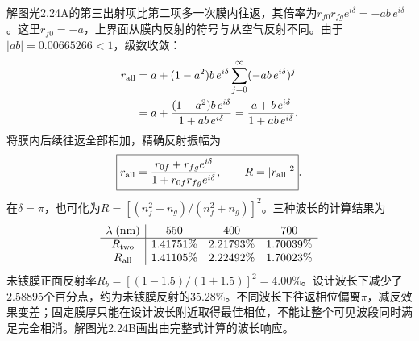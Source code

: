 \documentclass[UTF8,fontset=fandol,a4paper,11pt]{ctexart}
\begin{document}
解图光2.24A的第三出射项比第二项多一次膜内往返，其倍率为$r_{f0}r_{fg}e^{i\delta}=-ab\,e^{i\delta}$。这里$r_{f0}=-a$，上界面从膜内反射的符号与从空气反射不同。由于$|ab|=0.00665266<1$，级数收敛：
\[
\begin{aligned}
r_{\rm all}
&=a+(1-a^2)b\,e^{i\delta}
 \sum_{j=0}^{\infty}(-ab\,e^{i\delta})^j\\
&=a+\frac{(1-a^2)b\,e^{i\delta}}{1+ab\,e^{i\delta}}
=\frac{a+b\,e^{i\delta}}{1+ab\,e^{i\delta}}.
\end{aligned}
\]
将膜内后续往返全部相加，精确反射振幅为
\[
\boxed{r_{\rm all}=\frac{r_{0f}+r_{fg}e^{i\delta}}
{1+r_{0f}r_{fg}e^{i\delta}},\qquad R=|r_{\rm all}|^2}.
\]
在$\delta=\pi$，也可化为$R=[(n_f^2-n_g)/(n_f^2+n_g)]^2$。三种波长的计算结果为
\[
\begin{array}{c|ccc}
\lambda\;(\mathrm{nm})&550&400&700\\ \hline
R_{\rm two}&1.41751\%&2.21793\%&1.70039\%\\
R_{\rm all}&1.41105\%&2.22492\%&1.70023\%
\end{array}
\]
未镀膜正面反射率$R_b=[(1-1.5)/(1+1.5)]^2=4.00\%$。设计波长下减少了$2.58895$个百分点，约为未镀膜反射的$35.28\%$。不同波长下往返相位偏离$\pi$，减反效果变差；固定膜厚只能在设计波长附近取得最佳相位，不能让整个可见波段同时满足完全相消。解图光2.24B画出由完整式计算的波长响应。
\end{document}
